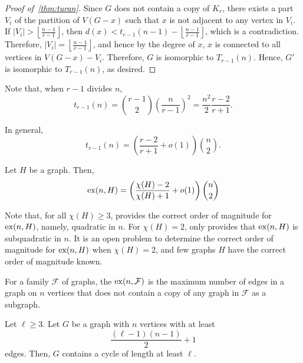 \begin{proof}[Proof of~\ref{thm:turan}]
    Since \(G\) does not contain a copy of \(K_r\),
    there exists a part \(V_i\) of the partition of \(V(G - x)\) such that \(x\) is not adjacent to any vertex in \(V_i\).
    If \(|V_i| > \left\lfloor \frac{n-1}{r-1} \right\rfloor\),
    then \(d(x) < t_{r-1}(n-1) - \left\lfloor \frac{n-1}{r-1} \right\rfloor\),
    which is a contradiction.
    Therefore, \(|V_i| = \left\lfloor \frac{n-1}{r-1} \right\rfloor\),
    and hence by the degree of \(x\),
    \(x\) is connected to all vertices in \(V(G - x) - V_i\).
    Therefore, \(G\) is isomorphic to \(T_{r-1}(n)\).
    Hence, \(G'\) is isomorphic to \(T_{r-1}(n)\), as desired.
\end{proof}

Note that, when \(r-1\) divides \(n\),
\begin{equation}
    t_{r-1}(n)
    =
    \binom{r-1}{2} \left( \frac{n}{r-1} \right)^2
    = \frac{n^2}{2} \frac{r-2}{r+1}.
\end{equation}

In general,
\begin{equation}
    t_{r-1}(n)
    =
    \left( \frac{r-2}{r+1} + o(1) \right)
    \binom{n}{2}.
\end{equation}

\begin{theorem} \label{thm:erdos-stone}
    Let \(H\) be a graph.
    Then,
    \begin{equation}
        \operatorname{ex}(n, H)
        =
        \left( \frac{\chi(H)-2}{\chi(H)+1} + o(1) \right)
        \binom{n}{2}
    \end{equation}
\end{theorem}

Note that,
for all \(\chi(H) \geq 3\), 
 provides the correct order of magnitude for \(\operatorname{ex}(n, H)\), namely, quadratic in \(n\).
For \(\chi(H) = 2\),  only provides that \(\operatorname{ex}(n, H)\) is subquadratic in \(n\).
It is an open problem to determine the correct order of magnitude for \(\operatorname{ex}(n, H)\) when \(\chi(H) = 2\), and few graphs \(H\) have the correct order of magnitude known.

For a family \(\mathcal{F}\) of graphs,
the  \(\operatorname{ex}(n, \mathcal{F})\) is the maximum number of edges in a graph on \(n\) vertices that does not contain a copy of any graph in \(\mathcal{F}\) as a subgraph.

\begin{theorem} \label{thm:erdos-gallai}
    Let \(\ell \geq 3\).
    Let \(G\) be a graph with \(n\) vertices
    with at least
    \begin{equation}
        \frac{(\ell - 1)(n-1)}{2} + 1
    \end{equation}
    edges.
    Then, \(G\) contains a cycle of length at least \(\ell\).
\end{theorem}

